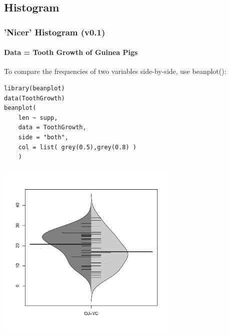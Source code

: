 \subsection{Histogram}
\begin{frame}
\frametitle{'Nicer' Histogram (v0.1)}
  \framesubtitle{Data = Tooth Growth of Guinea Pigs}

To compare the frequencies of two variables side-by-side, use \ttfamily beanplot(): \normalfont

	\begin{lstlisting}
library(beanplot)
data(ToothGrowth)
beanplot(
	len ~ supp, 
	data = ToothGrowth, 
	side = "both", 
	col = list( grey(0.5),grey(0.8) )
	)
	\end{lstlisting}

        \begin{center}
	         \includegraphics[width=0.65\textwidth]{images/beanplot_v0.pdf}
        \end{center}

\end{frame}

